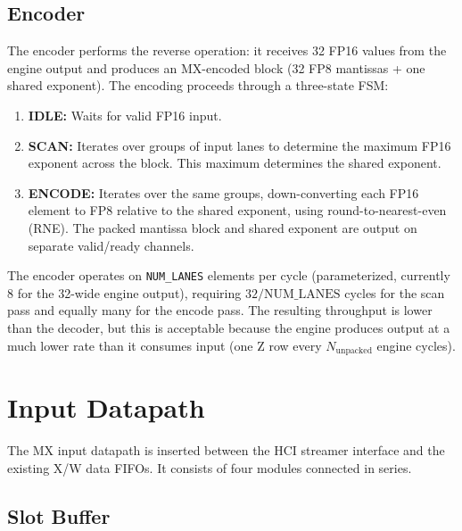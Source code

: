 \subsection{Encoder}
\label{ssec:mx-encoder}

The encoder performs the reverse operation: it receives 32 FP16 values from the
engine output and produces an MX-encoded block (32 FP8 mantissas + one shared
exponent). The encoding proceeds through a three-state FSM:

\begin{enumerate}
    \item \textbf{IDLE:} Waits for valid FP16 input.
    \item \textbf{SCAN:} Iterates over groups of input lanes to determine the
          maximum FP16 exponent across the block. This maximum determines the
          shared exponent.
    \item \textbf{ENCODE:} Iterates over the same groups, down-converting each
          FP16 element to FP8 relative to the shared exponent, using
          round-to-nearest-even (RNE). The packed mantissa block and shared
          exponent are output on separate valid/ready channels.
\end{enumerate}

The encoder operates on \texttt{NUM\_LANES} elements per cycle (parameterized,
currently 8 for the 32-wide engine output), requiring $32/\text{NUM\_LANES}$
cycles for the scan pass and equally many for the encode pass. The resulting
throughput is lower than the decoder, but this is acceptable because the engine
produces output at a much lower rate than it consumes input (one Z row every
$N_\text{unpacked}$ engine cycles).



\section{Input Datapath}
\label{sec:mx-input-datapath}

The MX input datapath is inserted between the HCI streamer interface and the
existing X/W data FIFOs. It consists of four modules connected in series.


\subsection{Slot Buffer}
\label{ssec:slot-buffer}

